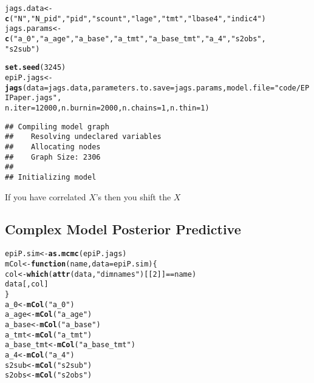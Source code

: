 \documentclass[12pt,letterpaper,oneside]{article}\usepackage{graphicx, color}
\makeatletter
\newcommand{\hlfunctioncall}[1]{\textcolor[rgb]{0.501960784313725,0,0.329411764705882}{\textbf{#1}}}%
\newcommand{\hlstring}[1]{\textcolor[rgb]{0.6,0.6,1}{#1}}%
\newenvironment{kframe}{%
 \def\at@end@of@kframe{}%
 \ifinner\ifhmode%
  \def\at@end@of@kframe{\end{minipage}}%
  \begin{minipage}{\columnwidth}%
 \fi\fi%
 \def\FrameCommand##1{\hskip\@totalleftmargin \hskip-\fboxsep
 \colorbox{shadecolor}{##1}\hskip-\fboxsep
     \hskip-\linewidth \hskip-\@totalleftmargin \hskip\columnwidth}%
 \MakeFramed {\advance\hsize-\width
   \@totalleftmargin\z@ \linewidth\hsize
   \@setminipage}}%
 {\par\unskip\endMakeFramed%
 \at@end@of@kframe}
\newenvironment{knitrout}{}{} %
\newcommand{\dateTaken}{January 7, 2013}
\makeatother
\begin{document}
\begin{knitrout}\scriptsize
{}\color{fgcolor}\begin{kframe}
\begin{alltt}
jags.data <- \hlfunctioncall{c}(\hlstring{"N"}, \hlstring{"N_pid"}, \hlstring{"pid"}, \hlstring{"scount"}, \hlstring{"lage"}, \hlstring{"tmt"}, \hlstring{"lbase4"}, \hlstring{"indic4"})
jags.params <- \hlfunctioncall{c}(\hlstring{"a_0"}, \hlstring{"a_age"}, \hlstring{"a_base"}, \hlstring{"a_tmt"}, \hlstring{"a_base_tmt"}, \hlstring{"a_4"}, \hlstring{"s2obs"}, 
    \hlstring{"s2sub"})

\hlfunctioncall{set.seed}(3245)
epiP.jags <- \hlfunctioncall{jags}(data = jags.data, parameters.to.save = jags.params, model.file = \hlstring{"code/EPIPaper.jags"}, 
    n.iter = 12000, n.burnin = 2000, n.chains = 1, n.thin = 1)
\end{alltt}


{\ttfamily\noindent\itshape\color{messagecolor}{\#\# module glm loaded}}\begin{verbatim}
## Compiling model graph
##    Resolving undeclared variables
##    Allocating nodes
##    Graph Size: 2306
## 
## Initializing model
\end{verbatim}
\end{kframe}
\end{knitrout}

If you have correlated $X$'s then you shift the $X$
\renewcommand{\dateTaken}{April  2, 2013}
\daysep
\subsection{Complex Model Posterior Predictive} %
\label{sub:complex_model_posterior_predictive}

\begin{knitrout}\scriptsize
{}\color{fgcolor}\begin{kframe}
\begin{alltt}
epiP.sim <- \hlfunctioncall{as.mcmc}(epiP.jags)
mCol <- \hlfunctioncall{function}(name, data = epiP.sim) \{
    col <- \hlfunctioncall{which}(\hlfunctioncall{attr}(data, \hlstring{"dimnames"})[[2]] == name)
    data[, col]
\}
a_0 <- \hlfunctioncall{mCol}(\hlstring{"a_0"})
a_age <- \hlfunctioncall{mCol}(\hlstring{"a_age"})
a_base <- \hlfunctioncall{mCol}(\hlstring{"a_base"})
a_tmt <- \hlfunctioncall{mCol}(\hlstring{"a_tmt"})
a_base_tmt <- \hlfunctioncall{mCol}(\hlstring{"a_base_tmt"})
a_4 <- \hlfunctioncall{mCol}(\hlstring{"a_4"})
s2sub <- \hlfunctioncall{mCol}(\hlstring{"s2sub"})
s2obs <- \hlfunctioncall{mCol}(\hlstring{"s2obs"})
\end{alltt}
\end{kframe}
\end{knitrout}
\end{document}
